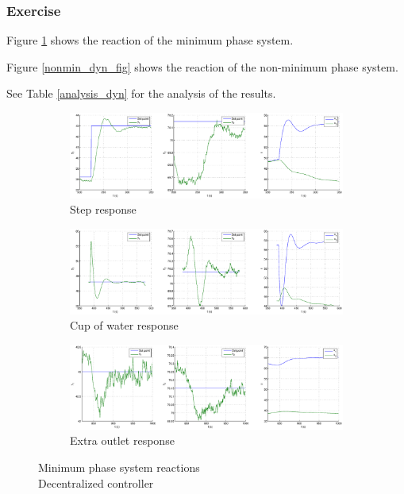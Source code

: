 \subsubsection{Exercise} 


Figure \ref{min_dyn_fig} shows the reaction of the minimum phase system.

Figure \ref{nonmin_dyn_fig} shows the reaction of the non-minimum phase system.

See Table \ref{analysis_dyn} for the analysis of the results. 

\begin{figure}[h!t]
        \centering
        \begin{subfigure}[b]{\columnwidth}
                \includegraphics[width=\columnwidth]{fig/min_dyn_step.eps}
                \caption{Step response}
        \end{subfigure}
        \begin{subfigure}[b]{\columnwidth}
                \includegraphics[width=\columnwidth]{fig/min_dyn_gob.eps}
                \caption{Cup of water response}
        \end{subfigure}
        \begin{subfigure}[b]{\columnwidth}
                \includegraphics[width=\columnwidth]{fig/min_dyn_fui.eps}
                \caption{Extra outlet response}
        \end{subfigure}
        \caption{Minimum phase system reactions \\ Decentralized controller}
        \label{min_dyn_fig}
\end{figure}

